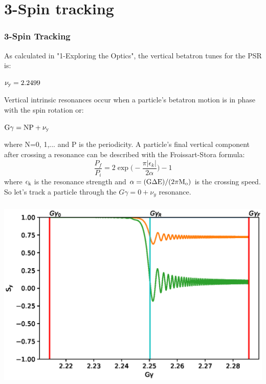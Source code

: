 \documentclass{beamer}
\begin{document}
\section{3-Spin tracking}
\begin{frame}
\frametitle{3-Spin Tracking}
\begin{minipage}{1.0\textwidth}
\small
As calculated in "1-Exploring the Optics", the vertical betatron tunes  for the PSR is:
\vspace{-0.2em}
\begin{center}
$\rm\nu_y=2.2499$
\end{center}
\vspace{-0.2em}
Vertical intrinsic resonances occur when a particle's betatron motion is in phase with the spin rotation or:
\vspace{-0.2em}
\begin{center}
$\rm G\gamma=NP+\nu_y$
\end{center}
\vspace{-0.2em}
where N=0, 1,... and P is the periodicity. A particle's final vertical component after crossing a resonance can be described with the Froissart-Stora formula:
\begin{equation}
\frac{P_f}{P_i}=2\exp\bigg(-\frac{\pi|\epsilon_k|}{2\alpha}\bigg)-1
\end{equation}
where $\rm\epsilon_k$ is the resonance strength and $\rm \alpha=(G\Delta E)/(2\pi M_o)$ is the crossing speed.\\
So let's track a particle through the $G\gamma=0+\nu_y$ resonance.
\end{minipage}
\end{frame}
\begin{frame}
\frametitle{}
\includegraphics[width=1.0\linewidth]{PSR_FStora.eps}
\end{frame}
\end{document}
